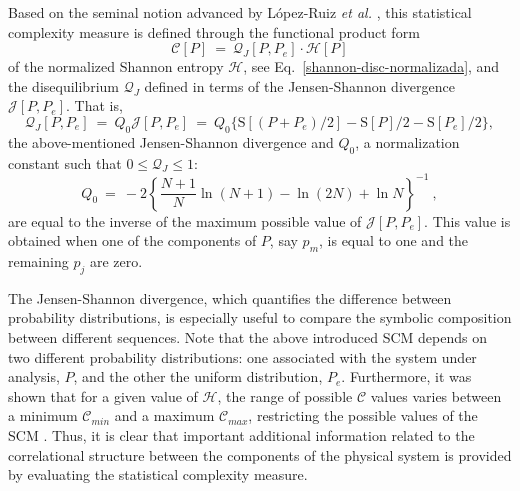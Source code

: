 Based on the seminal notion advanced by L\'opez-Ruiz {\it et al.} \cite{LMC1995}, this statistical complexity 
measure\cite{Martin2003,Lamberti2004} is defined through the functional product form
\begin{equation}
{\mathcal C}[P] ~=~ {\mathcal Q}_{J}[P,P_e] \cdot {\mathcal H}[P]
\label{complexity}
\end{equation}
of the normalized Shannon entropy ${\mathcal H}$, see Eq.~\eqref{shannon-disc-normalizada}, and the disequilibrium 
${\mathcal Q}_{J}$ defined in terms of the Jensen-Shannon divergence ${\mathcal J}[ P, P_e]$.
That is,
\begin{equation}
\label{disequilibrium}
{\mathcal Q}_{J} [ P, P_e] ~=~ Q_{0} {\mathcal J}[ P, P_e] ~=~ 
Q_{0} \{ {\mathrm S}[(P + P_e)/2 ] - {\mathrm S}[ P ]/2 - {\mathrm S}[P_e]/2\},
\end{equation}
the above-mentioned Jensen-Shannon divergence and $Q_0$, a normalization constant 
such that $0 \leq {\mathcal Q}_{J} \leq 1$:
\begin{equation}
Q_0 ~=~ -2 \left\{  {\frac{N+1}{N}}  \ln (N+1) - \ln (2N)  +  \ln N \right\}^{-1} \ ,
\label{q0-jensen-1}
\end{equation}
are equal to the inverse of the maximum possible value of ${\mathcal J} [P,P_e]$.
This value is obtained when one of the components of $P$, say $p_m$, is equal to one and the remaining $p_j$ 
are zero.

The Jensen-Shannon divergence, which quantifies the difference between probability distributions, 
is especially useful to compare the symbolic composition between different sequences\cite{JS-Div1991,Grosse2002,JS-Div2014}.
Note that the above introduced SCM depends on two different probability distributions: one associated with the 
system under analysis, $P$, and the other the uniform distribution, $P_e$.
Furthermore, it was shown that for a given value of ${\mathcal H}$, the range of possible ${\mathcal C}$ 
values varies between a minimum ${\mathcal C}_{min}$ and a maximum ${\mathcal C}_{max}$, 
restricting the possible values of the SCM \cite{Martin2006}.
Thus, it is clear that important additional information related to the correlational structure between the 
components of the physical system is provided by evaluating the statistical complexity measure. 

